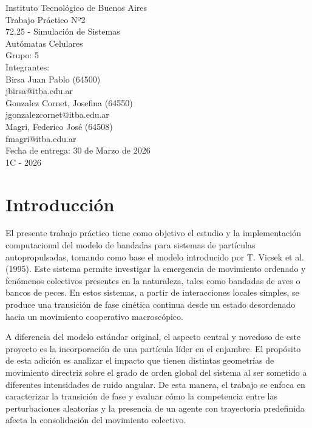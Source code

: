 \documentclass[a4paper,12pt]{article}
\begin{document}
\begin{titlepage}
	\centering

	Instituto Tecnológico de Buenos Aires\\
	Trabajo Práctico Nº2\\
	72.25 - Simulación de Sistemas\\[1cm]

	{\LARGE Autómatas Celulares}\\[1cm]

	Grupo: 5\\[0.5cm]

	Integrantes:\\
	Birsa Juan Pablo (64500)\\
	jbirsa@itba.edu.ar\\
	Gonzalez Cornet, Josefina (64550)\\
	jgonzalezcornet@itba.edu.ar\\
	Magri, Federico José (64508)\\
	fmagri@itba.edu.ar\\[1cm]

	Fecha de entrega: 30 de Marzo de 2026\\
	1C - 2026

\end{titlepage}

\tableofcontents
\newpage

\section{Introducción}

El presente trabajo práctico tiene como objetivo el estudio y la implementación computacional del modelo de bandadas para sistemas de partículas autopropulsadas, tomando como base el modelo introducido por T. Vicsek et al. (1995). Este sistema permite investigar la emergencia de movimiento ordenado y fenómenos colectivos presentes en la naturaleza, tales como bandadas de aves o bancos de peces. En estos sistemas, a partir de interacciones locales simples, se produce una transición de fase cinética continua desde un estado desordenado hacia un movimiento cooperativo macroscópico.

A diferencia del modelo estándar original, el aspecto central y novedoso de este proyecto es la incorporación de una partícula líder en el enjambre. El propósito de esta adición es analizar el impacto que tienen distintas geometrías de movimiento directriz sobre el grado de orden global del sistema al ser sometido a diferentes intensidades de ruido angular. De esta manera, el trabajo se enfoca en caracterizar la transición de fase y evaluar cómo la competencia entre las perturbaciones aleatorias y la presencia de un agente con trayectoria predefinida afecta la consolidación del movimiento colectivo.
\end{document}
